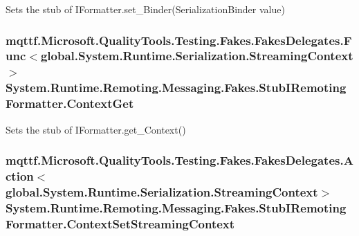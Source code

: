 Sets the stub of I\-Formatter.\-set\-\_\-\-Binder(\-Serialization\-Binder value)

\hypertarget{class_system_1_1_runtime_1_1_remoting_1_1_messaging_1_1_fakes_1_1_stub_i_remoting_formatter_a2c4de1f2e75875b4d32f88f904d378b4}{
\subsubsection[{Context\-Get}]{\setlength{\rightskip}{0pt plus 5cm}mqttf.\-Microsoft.\-Quality\-Tools.\-Testing.\-Fakes.\-Fakes\-Delegates.\-Func$<$global.\-System.\-Runtime.\-Serialization.\-Streaming\-Context$>$ System.\-Runtime.\-Remoting.\-Messaging.\-Fakes.\-Stub\-I\-Remoting\-Formatter.\-Context\-Get}}\label{class_system_1_1_runtime_1_1_remoting_1_1_messaging_1_1_fakes_1_1_stub_i_remoting_formatter_a2c4de1f2e75875b4d32f88f904d378b4}


Sets the stub of I\-Formatter.\-get\-\_\-\-Context()

\hypertarget{class_system_1_1_runtime_1_1_remoting_1_1_messaging_1_1_fakes_1_1_stub_i_remoting_formatter_a6c58a7de2e63875e5fad5ea924acb362}{
\subsubsection[{Context\-Set\-Streaming\-Context}]{\setlength{\rightskip}{0pt plus 5cm}mqttf.\-Microsoft.\-Quality\-Tools.\-Testing.\-Fakes.\-Fakes\-Delegates.\-Action$<$global.\-System.\-Runtime.\-Serialization.\-Streaming\-Context$>$ System.\-Runtime.\-Remoting.\-Messaging.\-Fakes.\-Stub\-I\-Remoting\-Formatter.\-Context\-Set\-Streaming\-Context}}\label{class_system_1_1_runtime_1_1_remoting_1_1_messaging_1_1_fakes_1_1_stub_i_remoting_formatter_a6c58a7de2e63875e5fad5ea924acb362}


